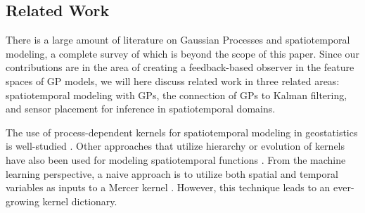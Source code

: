 \subsection{Related Work}\label{sec:related}
There is a large amount of literature on Gaussian Processes and spatiotemporal modeling, a complete survey of which is beyond the scope of this paper. Since our contributions are in the area of creating a feedback-based observer in the feature spaces of GP models, we will here discuss  related work in three related areas: spatiotemporal modeling with GPs, the connection of GPs to Kalman filtering, and sensor placement for inference in spatiotemporal domains.
 
The use of process-dependent kernels for spatiotemporal modeling in geostatistics is well-studied \cite{wikle2002kernel,cressie2011statistics,stroud2001dynamic}. Other approaches that utilize hierarchy or evolution of kernels have also been used for modeling spatiotemporal functions \cite{hartikainen2013sequential,lindgren2011explicit,ho1996multiresolution}.
From the machine learning perspective, a naive approach is to utilize both spatial and temporal variables as inputs to a Mercer kernel \cite{perez2013gaussian}. However, this technique leads to an ever-growing kernel dictionary. %
